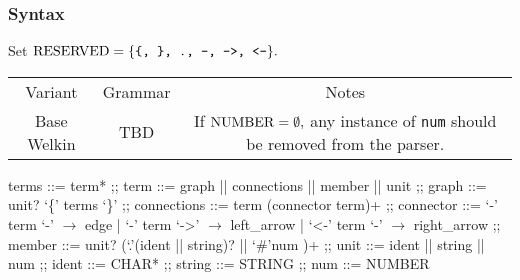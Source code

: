 \subsubsection*{Syntax}
Set $\mathrm{RESERVED} = \{\texttt{\{, \}, ., -, ->, <-}\}.$
\begin{center}
  \begin{tabular}{ | c | c | c |}
	Variant & Grammar & Notes \\
	Base Welkin & TBD & If $\mathrm{NUMBER} = \emptyset,$ any instance of \texttt{num} should be removed from the parser. \\

\end{tabular}
\end{center}
\begin{center}\begin{bnfgrammar}
	terms ::= term* ;;
	term ::= graph || connections || member || unit ;;
	graph ::= unit? `\{' terms `\}' ;;
	connections ::= term (connector term)+ ;;
	connector ::= `-' term `-' $\to$ edge
	| `-' term `->' $\to$ left\_arrow
	| `<-' term `-' $\to$ right\_arrow ;;
	member ::= unit? (`.'(ident || string)? || `\#'num )+ ;;
	unit ::= ident || string || num ;;
	ident ::= CHAR* ;;
	string ::= STRING ;;
	num ::= NUMBER
  \end{bnfgrammar}
\end{center}

